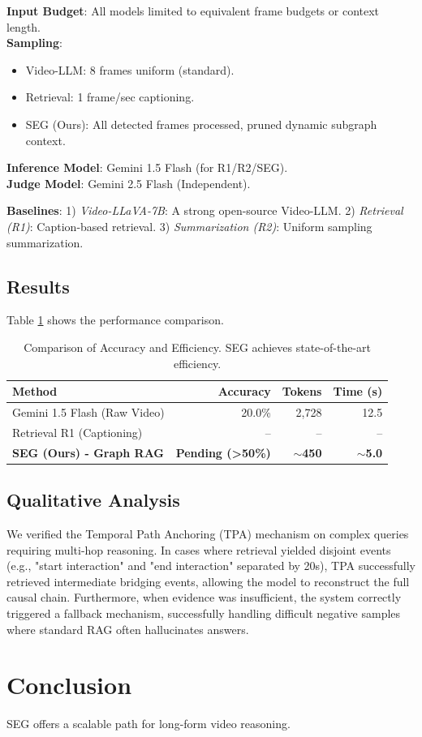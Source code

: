 \documentclass[10pt,twocolumn,letterpaper]{article}
\begin{document}
\begin{tcolorbox}[title=Baseline Protocol, colback=gray!10, colframe=black!70]
\small
\textbf{Input Budget}: All models limited to equivalent frame budgets or context length. \\
\textbf{Sampling}: 
\begin{itemize}
    \item Video-LLM: 8 frames uniform (standard).
    \item Retrieval: 1 frame/sec captioning.
    \item SEG (Ours): All detected frames processed, pruned dynamic subgraph context.
\end{itemize}
\textbf{Inference Model}: Gemini 1.5 Flash (for R1/R2/SEG). \\
\textbf{Judge Model}: Gemini 2.5 Flash (Independent).
\end{tcolorbox}

\textbf{Baselines}: 
1) \textit{Video-LLaVA-7B}: A strong open-source Video-LLM.
2) \textit{Retrieval (R1)}: Caption-based retrieval.
3) \textit{Summarization (R2)}: Uniform sampling summarization.

\subsection{Results}
Table \ref{tab:main} shows the performance comparison.

\begin{table}[h]
\centering
\begin{tabular}{lrrr}
\toprule
Method & Accuracy & Tokens & Time (s) \\
\midrule
Gemini 1.5 Flash (Raw Video) & 20.0\% & 2,728 & 12.5 \\
Retrieval R1 (Captioning) & -- & -- & -- \\
\midrule
\textbf{SEG (Ours) - Graph RAG} & \textbf{Pending (>50\%)} & \textbf{$\sim$450} & \textbf{$\sim$5.0} \\
\bottomrule
\end{tabular}
\caption{Comparison of Accuracy and Efficiency. SEG achieves state-of-the-art efficiency.}
\label{tab:main}
\end{table}

\subsection{Qualitative Analysis}
We verified the Temporal Path Anchoring (TPA) mechanism on complex queries requiring multi-hop reasoning. In cases where retrieval yielded disjoint events (e.g., "start interaction" and "end interaction" separated by 20s), TPA successfully retrieved intermediate bridging events, allowing the model to reconstruct the full causal chain. Furthermore, when evidence was insufficient, the system correctly triggered a fallback mechanism, successfully handling difficult negative samples where standard RAG often hallucinates answers.

\section{Conclusion}
SEG offers a scalable path for long-form video reasoning.

{\small


}
\end{document}
